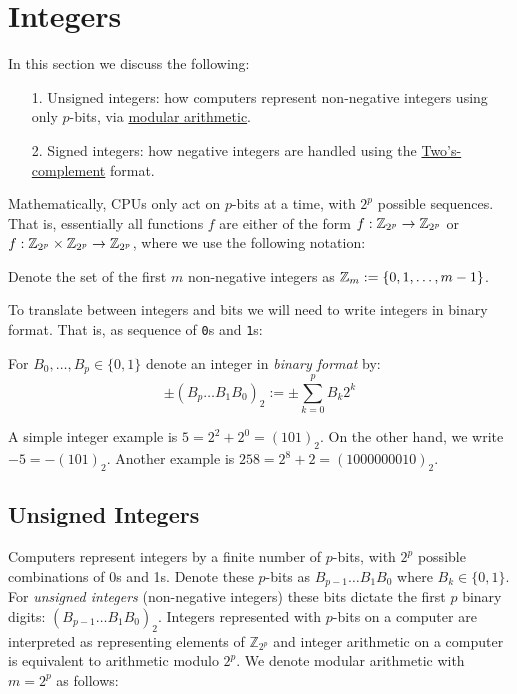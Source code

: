
\section{Integers}
In this section we discuss the following:

\begin{itemize}
\item[1. ] Unsigned integers: how computers represent non-negative integers using only $p$-bits, via \href{https://en.wikipedia.org/wiki/Modular_arithmetic}{modular arithmetic}.


\item[2. ] Signed integers: how negative integers are handled using the \href{https://en.wikipedia.org/wiki/Two's_complement}{Two's-complement} format.

\end{itemize}
Mathematically, CPUs only act on $p$-bits at a time, with $2^p$ possible sequences. That is, essentially all functions $f$ are either of the form $f : {\mathbb Z}_{2^p} \rightarrow {\mathbb Z}_{2^p}$ or  $f : {\mathbb Z}_{2^p} \times {\mathbb Z}_{2^p} \rightarrow {\mathbb Z}_{2^p}$, where we use the following notation:

\begin{definition} Denote the set of the first $m$ non-negative integers as ${\mathbb Z}_m := \{0 , 1 , \ldots, m-1 \}$. \end{definition}

To translate between integers and bits we will need to write integers in binary format.  That is, as sequence of \texttt{0}s and \texttt{1}s:

\begin{definition} For $B_0,\ldots,B_p \in \{0,1\}$ denote an integer in \emph{binary format} by:
\[
\ensuremath{\pm}(B_p\ldots B_1B_0)_2 := \ensuremath{\pm}\sum_{k=0}^p B_k 2^k
\]
\end{definition}

\begin{example} A simple integer example is $5 = 2^2 + 2^0 = (101)_2$. On the other hand, we write $-5 = -(101)_2$. Another example is $258 = 2^8 + 2 = (1000000010)_2$. \end{example}

\subsection{Unsigned Integers}
Computers represent integers by a finite number of $p$-bits, with $2^p$ possible combinations of 0s and 1s. Denote these $p$-bits as $B_{p-1}\ensuremath{\ldots}B_1B_0$ where $B_k \ensuremath{\in} \{0,1\}$. For \emph{unsigned integers} (non-negative integers) these bits dictate the first $p$ binary digits: $(B_{p-1}\ldots B_1B_0)_2$. Integers represented with $p$-bits on a computer are interpreted as  representing elements of ${\mathbb Z}_{2^p}$ and integer arithmetic on a computer is equivalent to arithmetic modulo $2^p$. We denote modular arithmetic with $m = 2^p$ as follows:


